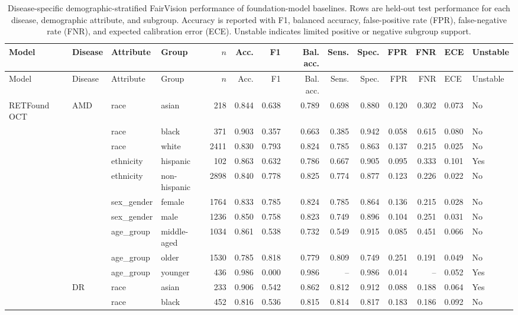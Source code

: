\begingroup
\scriptsize
\setlength{\tabcolsep}{3pt}
\begin{longtable}{@{}lll l rrrrrrrr@{}}
\caption{Disease-specific demographic-stratified FairVision performance of foundation-model baselines. Rows are held-out test performance for each disease, demographic attribute, and subgroup. Accuracy is reported with F1, balanced accuracy, false-positive rate (FPR), false-negative rate (FNR), and expected calibration error (ECE). Unstable indicates limited positive or negative subgroup support.}\label{tab:fairvision_foundation_demographic_by_disease}\\
\toprule
Model & Disease & Attribute & Group & $n$ & Acc. & F1 & Bal. acc. & Sens. & Spec. & FPR & FNR & ECE & Unstable \\
\midrule
\endfirsthead
\toprule
Model & Disease & Attribute & Group & $n$ & Acc. & F1 & Bal. acc. & Sens. & Spec. & FPR & FNR & ECE & Unstable \\
\midrule
\endhead
RETFound OCT & AMD & race & asian & 218 & 0.844 & 0.638 & 0.789 & 0.698 & 0.880 & 0.120 & 0.302 & 0.073 & No \\
 &  & race & black & 371 & 0.903 & 0.357 & 0.663 & 0.385 & 0.942 & 0.058 & 0.615 & 0.080 & No \\
 &  & race & white & 2411 & 0.830 & 0.793 & 0.824 & 0.785 & 0.863 & 0.137 & 0.215 & 0.025 & No \\
 &  & ethnicity & hispanic & 102 & 0.863 & 0.632 & 0.786 & 0.667 & 0.905 & 0.095 & 0.333 & 0.101 & Yes \\
 &  & ethnicity & non-hispanic & 2898 & 0.840 & 0.778 & 0.825 & 0.774 & 0.877 & 0.123 & 0.226 & 0.022 & No \\
 &  & sex\_gender & female & 1764 & 0.833 & 0.785 & 0.824 & 0.785 & 0.864 & 0.136 & 0.215 & 0.028 & No \\
 &  & sex\_gender & male & 1236 & 0.850 & 0.758 & 0.823 & 0.749 & 0.896 & 0.104 & 0.251 & 0.031 & No \\
 &  & age\_group & middle-aged & 1034 & 0.861 & 0.538 & 0.732 & 0.549 & 0.915 & 0.085 & 0.451 & 0.066 & No \\
 &  & age\_group & older & 1530 & 0.785 & 0.818 & 0.779 & 0.809 & 0.749 & 0.251 & 0.191 & 0.049 & No \\
 &  & age\_group & younger & 436 & 0.986 & 0.000 & 0.986 & -- & 0.986 & 0.014 & -- & 0.052 & Yes \\
 & DR & race & asian & 233 & 0.906 & 0.542 & 0.862 & 0.812 & 0.912 & 0.088 & 0.188 & 0.064 & Yes \\
 &  & race & black & 452 & 0.816 & 0.536 & 0.815 & 0.814 & 0.817 & 0.183 & 0.186 & 0.092 & No \\

\end{longtable}
